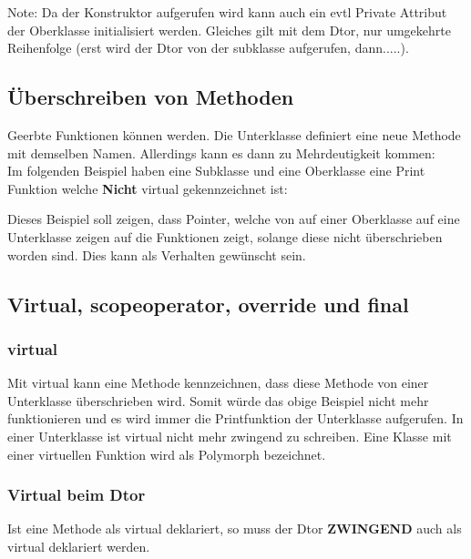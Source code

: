 

Note: Da der Konstruktor aufgerufen wird kann auch ein evtl Private Attribut der Oberklasse initialisiert werden.
Gleiches gilt mit dem Dtor, nur umgekehrte Reihenfolge (erst wird der Dtor von der subklasse aufgerufen, dann.....).

\subsection{Überschreiben von Methoden}

Geerbte Funktionen können  werden. 
Die Unterklasse definiert eine neue Methode mit demselben Namen.
Allerdings kann es dann zu Mehrdeutigkeit kommen:\\
Im folgenden Beispiel haben eine Subklasse und eine Oberklasse eine Print Funktion welche \textbf{Nicht} virtual gekennzeichnet ist:




Dieses Beispiel soll zeigen, dass Pointer, welche von auf einer Oberklasse auf eine Unterklasse zeigen auf die  Funktionen zeigt, solange diese nicht überschrieben worden sind.
Dies kann als Verhalten gewünscht sein. 


\subsection{Virtual, scopeoperator, override und final}

\subsubsection{virtual}

Mit virtual kann eine Methode kennzeichnen, dass diese Methode von einer Unterklasse überschrieben wird.
Somit würde das obige Beispiel nicht mehr funktionieren und es wird immer die Printfunktion der Unterklasse aufgerufen. 
In einer Unterklasse ist virtual nicht mehr zwingend zu schreiben.
Eine Klasse mit einer virtuellen Funktion wird als Polymorph bezeichnet.

\subsubsection{Virtual beim Dtor}

Ist eine Methode als virtual deklariert, so muss der Dtor \textbf{ZWINGEND} auch als virtual deklariert werden.

